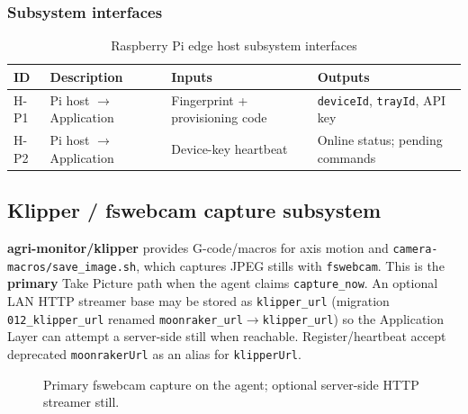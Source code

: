 \subsubsection{Subsystem interfaces}
\begin{table}[H]
\centering
\small
\begin{tabular}{|p{0.9cm}|p{3.4cm}|p{3.0cm}|p{3.5cm}|}
\hline
\textbf{ID} & \textbf{Description} & \textbf{Inputs} & \textbf{Outputs} \\
\hline
H-P1 & Pi host $\rightarrow$ Application & Fingerprint + provisioning code & \texttt{deviceId}, \texttt{trayId}, API key \\
\hline
H-P2 & Pi host $\rightarrow$ Application & Device-key heartbeat & Online status; pending commands \\
\hline
\end{tabular}
\caption{Raspberry Pi edge host subsystem interfaces}
\end{table}

\subsection{Klipper / fswebcam capture subsystem}

\textbf{agri-monitor/klipper}\cite{klipper} provides G-code/macros for axis motion and
\texttt{camera-macros/save\_image.sh}, which captures JPEG stills with \texttt{fswebcam}. This is
the \textbf{primary} Take Picture path when the agent claims \texttt{capture\_now}. An optional LAN
HTTP streamer base may be stored as \texttt{klipper\_url} (migration \texttt{012\_klipper\_url} renamed
\texttt{moonraker\_url}$\rightarrow$\texttt{klipper\_url}) so the Application Layer can attempt a
server-side still when reachable. Register/heartbeat accept deprecated \texttt{moonrakerUrl} as an
alias for \texttt{klipperUrl}.

\begin{figure}[H]
\centering
{}
\caption{Primary fswebcam capture on the agent; optional server-side HTTP streamer still.}
\label{fig:hw-moonraker}
\end{figure}


